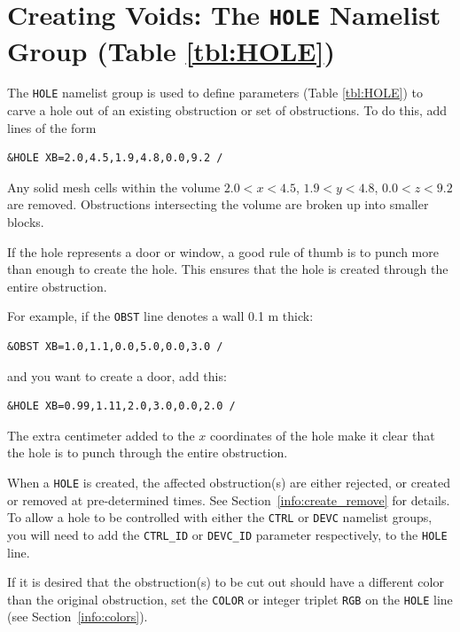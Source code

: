 \documentclass[11pt]{book}
\newcommand{\ct}{\tt\small}
\begin{document}
\section{Creating Voids: The \texorpdfstring{{\tt HOLE}}{HOLE} Namelist Group (Table \ref{tbl:HOLE})}
\label{info:HOLE}

The {\ct HOLE} namelist group is used to define parameters (Table \ref{tbl:HOLE}) to carve a hole
out of an existing obstruction or set of obstructions. To do this, add lines of the form

\footnotesize
\begin{verbatim}
&HOLE XB=2.0,4.5,1.9,4.8,0.0,9.2 /
\end{verbatim}
\normalsize
Any solid mesh cells within the volume $2.0<x<4.5$, $1.9<y<4.8$,
$0.0<z<9.2$ are removed. Obstructions intersecting the volume are
broken up into smaller blocks.

\begin{notebox}
\noindent
If the hole represents a door or window, a good rule of thumb is to punch more than enough to create the hole.
This ensures that the hole is created through the entire obstruction.
\end{notebox}

\noindent
For example, if the {\ct OBST} line denotes a wall 0.1 m thick:

\footnotesize
\begin{verbatim}
&OBST XB=1.0,1.1,0.0,5.0,0.0,3.0 /
\end{verbatim}
\normalsize
and you want to create a door, add this:

\footnotesize
\begin{verbatim}
&HOLE XB=0.99,1.11,2.0,3.0,0.0,2.0 /
\end{verbatim}
\normalsize
The extra centimeter added to the $x$ coordinates of the hole make it clear
that the hole is to punch through the entire obstruction.

When a {\ct HOLE} is created, the affected obstruction(s) are either rejected, or
created or removed at pre-determined times. See Section~\ref{info:create_remove} for details.
To allow a hole to be controlled with either the {\ct CTRL} or {\ct DEVC} namelist groups, you will need to add the {\ct CTRL\_ID} or {\ct DEVC\_ID} parameter respectively, to the {\ct HOLE} line. 

If it is desired that the obstruction(s) to be cut out should have a different color
than the original obstruction, set the {\ct COLOR}  or integer triplet
{\ct RGB}  on the {\ct HOLE} line (see Section~\ref{info:colors}).
\end{document}
